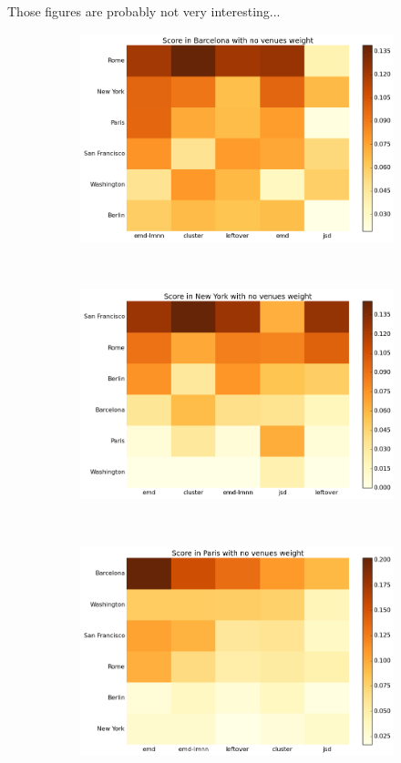 \documentclass[svgnames,a4paper,final,notitlepage,10pt]{article}
\begin{document}
Those figures are probably not very interesting...
\begin{figure}[h]
    \begin{subfigure}[b]{0.3\textwidth}
        \centering
        \includegraphics[width=\linewidth]{metrics_from_barcelona.png}
    \end{subfigure}~
    \begin{subfigure}[b]{0.3\textwidth}
        \centering
	\includegraphics[width=\linewidth]{metrics_from_newyork.png}
    \end{subfigure}~
    \begin{subfigure}[b]{0.3\textwidth}
        \centering
	\includegraphics[width=\linewidth]{metrics_from_paris.png}
    \end{subfigure}


\end{figure}
\end{document}
